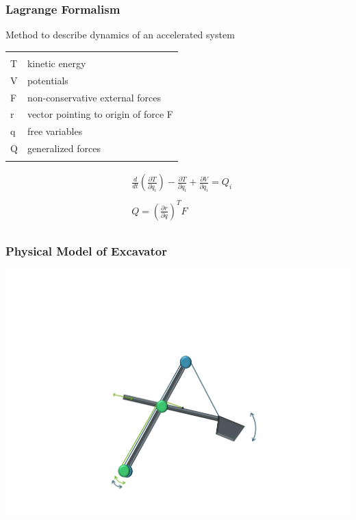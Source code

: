 \documentclass{beamer}
\begin{document}
\begin{frame}
	\frametitle{Lagrange Formalism}
	
	Method to describe dynamics of an accelerated system\\
	\begin{small}
	\begin{tabular}{ll}
		 & \\
		T & kinetic energy\\
		V & potentials\\
		F & non-conservative external forces\\
		r & vector pointing to origin of force F\\ %
		q & free variables\\
		Q & generalized forces\\ \\
	\end{tabular}
	\end{small}
	\begin{align*}
	&\frac{d}{dt}\left(\frac{\partial T}{\partial \dot{q}_i}\right) -
	\frac{\partial T}{\partial q_i} +
	\frac{\partial V}{\partial q_i}
	= Q_i \\ \\
	& Q = \left(\frac{\partial r}{\partial q}\right)^T F\\
	\end{align*}
		
\end{frame}	

\begin{frame}
	\frametitle{Physical Model of Excavator}
	
	\includegraphics[trim=22cm 5cm 2cm 23cm, clip=true, width=\linewidth]{Exc/Excavator_Only}
	
\end{frame}
\end{document}
